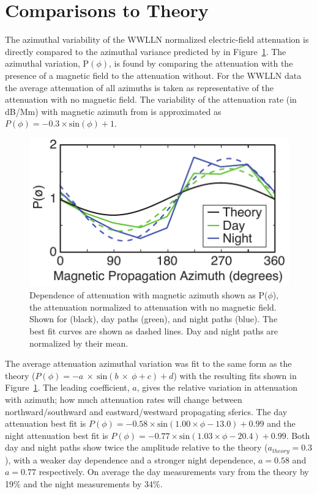 \section{Comparisons to Theory}

The azimuthal variability of the WWLLN normalized electric-field attenuation is directly compared to the azimuthal variance predicted by \citet{Wait1960a} in Figure~\ref{azimuth:fig:attenuationTheory}.
The azimuthal variation, P$(\phi)$, is found by comparing the attenuation with the presence of a magnetic field to the attenuation without.
For the WWLLN data the average attenuation of all azimuths is taken as representative of the attenuation with no magnetic field.
The variability of the attenuation rate (in dB/Mm) with magnetic azimuth from \citet{Wait1960a} is approximated as $P(\phi) = - 0.3 \times \text{sin}(\phi) + 1$.

\begin{figure}[h!t]
   \centering
   \includegraphics[scale=1]{Azimuth/Figures/attenuationTheory.pdf} 
   \caption{Dependence of attenuation with magnetic azimuth shown as P($\phi$), the attenuation normalized to attenuation with no magnetic field.
   	Shown for \citet{Wait1960a} (black), day paths (green), and night paths (blue).
	The best fit curves are shown as dashed lines.
	Day and night paths are normalized by their mean.}
   \label{azimuth:fig:attenuationTheory}
\end{figure}

The average attenuation azimuthal variation was fit to the same form as the theory ($P(\phi) = - a~\times~\text{sin}(b~\times~\phi + c) + d$) with the resulting fits shown in Figure~\ref{azimuth:fig:attenuationTheory}.
The leading coefficient, $a$, gives the relative variation in attenuation with azimuth; how much attenuation rates will change between northward/southward and eastward/westward propagating sferics.
The day attenuation best fit is $P(\phi) = - 0.58 \times \text{sin}(1.00\times\phi - 13.0) + 0.99$ and the night attenuation best fit is $P(\phi) = - 0.77 \times \text{sin}(1.03\times\phi - 20.4) + 0.99$.
Both day and night paths show twice the amplitude relative to the theory ($a_{theory} = 0.3$), with a weaker day dependence and a stronger night dependence, $a=0.58$ and $a=0.77$ respectively.
On average the day measurements vary from the theory by 19\% and the night measurements by 34\%.

